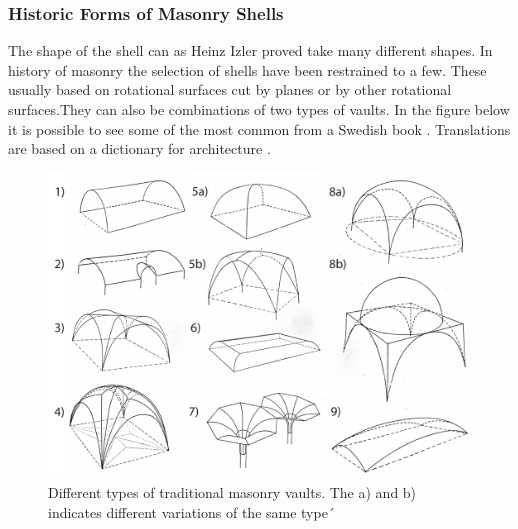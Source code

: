 \subsubsection{Historic Forms of Masonry Shells} \label{sec:masonryShells}

The shape of the shell can as Heinz Izler proved take many different shapes. In history of masonry the selection of shells have been restrained to a few. These usually based on rotational surfaces cut by planes or by other rotational surfaces.They can also be combinations of two types of vaults. In the figure below it is possible to see some of the most common from a Swedish book \cite{ref:murning}. Translations are based on a dictionary for architecture \cite{ref:lexi}.


\begin{figure}[H]
\centering
\includegraphics[width=0.8\linewidth ]{figure/Introduction/TypValvNum.pdf}
\caption{Different types of traditional masonry vaults. The a) and b) indicates different variations of the same type´\cite{ref:murning}}
\end{figure}



